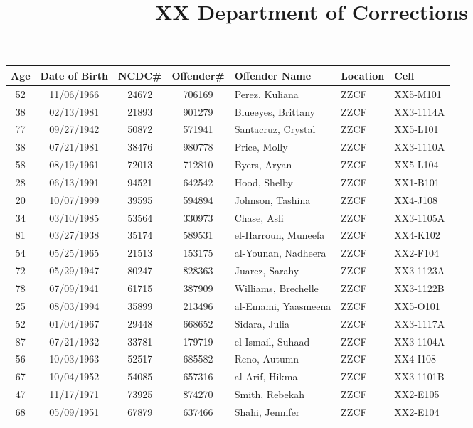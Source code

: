 \documentclass[]{article}
\title{XX Department of Corrections}
\author{}
\date{}
\begin{document}
\maketitle

\begin{tabular}{cccclll}
 {\textbf{Age}} & {\textbf{Date of Birth}} & {\textbf{NCDC\#}} & {\textbf{Offender\#}} & {\textbf{Offender Name}} & {\textbf{Location}} & {\textbf{Cell}} \\ 
  \hline
 52 & 11/06/1966 & 24672 & 706169 & Perez, Kuliana & ZZCF & XX5-M101 \\ 
   38 & 02/13/1981 & 21893 & 901279 & Blueeyes, Brittany & ZZCF & XX3-1114A \\ 
   77 & 09/27/1942 & 50872 & 571941 & Santacruz, Crystal & ZZCF & XX5-L101 \\ 
   38 & 07/21/1981 & 38476 & 980778 & Price, Molly & ZZCF & XX3-1110A \\ 
   58 & 08/19/1961 & 72013 & 712810 & Byers, Aryan & ZZCF & XX5-L104 \\ 
   28 & 06/13/1991 & 94521 & 642542 & Hood, Shelby & ZZCF & XX1-B101 \\ 
   20 & 10/07/1999 & 39595 & 594894 & Johnson, Tashina & ZZCF & XX4-J108 \\ 
   34 & 03/10/1985 & 53564 & 330973 & Chase, Asli & ZZCF & XX3-1105A \\ 
   81 & 03/27/1938 & 35174 & 589531 & el-Harroun, Muneefa & ZZCF & XX4-K102 \\ 
   54 & 05/25/1965 & 21513 & 153175 & al-Younan, Nadheera & ZZCF & XX2-F104 \\ 
   72 & 05/29/1947 & 80247 & 828363 & Juarez, Sarahy & ZZCF & XX3-1123A \\ 
   78 & 07/09/1941 & 61715 & 387909 & Williams, Brechelle & ZZCF & XX3-1122B \\ 
   25 & 08/03/1994 & 35899 & 213496 & al-Emami, Yaasmeena & ZZCF & XX5-O101 \\ 
   52 & 01/04/1967 & 29448 & 668652 & Sidara, Julia & ZZCF & XX3-1117A \\ 
   87 & 07/21/1932 & 33781 & 179719 & el-Ismail, Suhaad & ZZCF & XX3-1104A \\ 
   56 & 10/03/1963 & 52517 & 685582 & Reno, Autumn & ZZCF & XX4-I108 \\ 
   67 & 10/04/1952 & 54085 & 657316 & al-Arif, Hikma & ZZCF & XX3-1101B \\ 
   47 & 11/17/1971 & 73925 & 874270 & Smith, Rebekah & ZZCF & XX2-E105 \\ 
   68 & 05/09/1951 & 67879 & 637466 & Shahi, Jennifer & ZZCF & XX2-E104 \\ 

\end{tabular}
\end{document}
